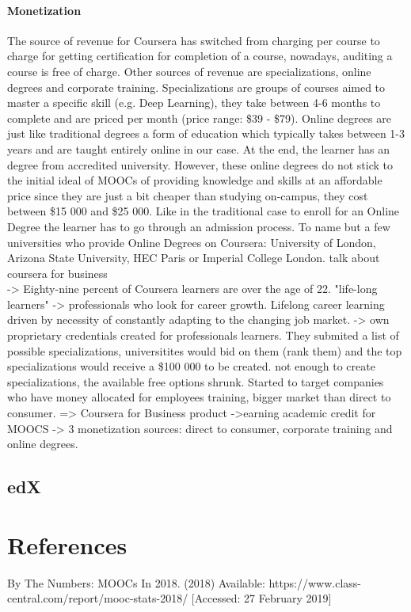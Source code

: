\documentclass[11]{article}
\begin{document}
   	\paragraph{Monetization\\}
	The source of revenue for Coursera has switched from charging per course to charge for getting certification for completion of a course, nowadays, auditing a course is free of charge. Other sources of revenue are specializations, online degrees and corporate training. Specializations are groups of courses aimed to master a specific skill (e.g. Deep Learning), they take between 4-6 months to complete and are priced per month (price range: \$39 - \$79). Online degrees are just like traditional degrees a form of education which typically takes between 1-3 years and are taught entirely online in our case. At the end, the learner has an degree from accredited university. However, these online degrees do not stick to the initial ideal of MOOCs of providing knowledge and skills at an affordable price since they are just a bit cheaper than studying on-campus, they cost between \$15 000 and \$25 000. Like in the traditional case to enroll for an Online Degree the learner has to go through an admission process. To name but a few universities who provide Online Degrees on Coursera: University of London, Arizona State University, HEC Paris or Imperial College London. talk about coursera for business\\  

	-> Eighty-nine percent of Coursera learners are over the age of 22. "life-long learners" -> professionals who look for career growth. Lifelong career learning driven by necessity of constantly adapting to the changing job market.
	-> own proprietary credentials created for professionals learners. They submited a list of possible specializations, universitites would bid on them (rank them) and the top specializations would receive a \$100 000 to be created.
	not enough to create specializations, the available free options shrunk. Started to target companies who have money allocated for employees training, bigger market than direct to consumer. => Coursera for Business product
	->earning academic credit for MOOCS
	-> 3 monetization sources: direct to consumer, corporate training and online degrees.
	\subsection{edX}

\newpage
\section{References}
By The Numbers: MOOCs In 2018. (2018) Available: https://www.class-central.com/report/mooc-stats-2018/ [Accessed: 27 February 2019]\\
\end{document}
